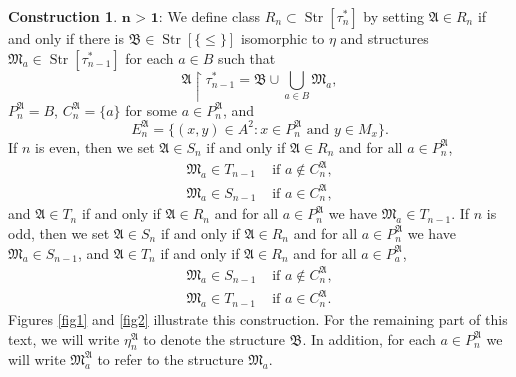 \documentclass{ndjflart}
\theoremstyle{plain}
\theoremstyle{definition}
\newtheorem{construction}[conjecture]{Construction}
\numberwithin{equation}{section}
\DeclareMathOperator{\Str}{Str}
\begin{document}
\begin{construction}
$\textbf{n > 1:}$ We define class $R_n \subset \Str[\tau_n^*]$ by setting $\mathfrak{A} \in R_n$ if and only if there is $\mathfrak{B} \in \Str[\{\leq\}]$ isomorphic to $\eta$ and structures $\mathfrak{M}_a \in \Str[\tau^*_{n-1}]$ for each $a \in B$ such that
\[
	\mathfrak{A} \upharpoonright \tau^*_{n-1}  = \mathfrak{B} \cup \bigcup_{a \in B}\mathfrak{M}_a,
\] 
$P_n^{\mathfrak{A}} = B$, $C_n^{\mathfrak{A}} = \{a\}$ for some $a \in P_n^{\mathfrak{A}}$, and
\[
	E_n^{\mathfrak{A}} = \{(x,y) \in A^2 \colon x \in P_n^{\mathfrak{A}} \text{ and } y \in M_x \}.
\]
If $n$ is even, then we set $\mathfrak{A}\in S_n$ if and only if $\mathfrak{A} \in R_n$ and for all $a\in P^{\mathfrak{A}}_n$,
\begin{align*}
	\mathfrak{M}_a \in T_{n-1} &\text{ if } a \notin C^{\mathfrak{A}}_n,\\
	\mathfrak{M}_a \in S_{n-1} &\text{ if } a \in C^{\mathfrak{A}}_n,
\end{align*}
and $\mathfrak{A} \in T_n$ if and only if $\mathfrak{A} \in R_n$ and for all $a \in P_n^{\mathfrak{A}}$ we have
$\mathfrak{M}_a \in T_{n-1}$.
If $n$ is odd, then we set $\mathfrak{A} \in S_n$ if and only if $\mathfrak{A} \in R_n$ and for all $a \in P^{\mathfrak{A}}_n$ we have $\mathfrak{M}_a \in S_{n-1}$, and $\mathfrak{A} \in T_n$ if and only if $\mathfrak{A} \in R_n$ and for all $a \in P^{\mathfrak{A}}_a$,
\begin{align*}
	\mathfrak{M}_a \in S_{n-1} &\text{ if } a \notin C^{\mathfrak{A}}_n,\\
	\mathfrak{M}_a \in T_{n-1} &\text{ if } a \in C^{\mathfrak{A}}_n.
\end{align*}
Figures \ref{fig1} and \ref{fig2} illustrate this construction.
For the remaining part of this text, we will write $\eta_n^{\mathfrak{A}}$ to denote the structure $\mathfrak{B}$.
In addition, for each $a \in P^{\mathfrak{A}}_n$ we will write $\mathfrak{M}^{\mathfrak{A}}_a$ to refer to the structure $\mathfrak{M}_a$.


\end{construction}
\end{document}
